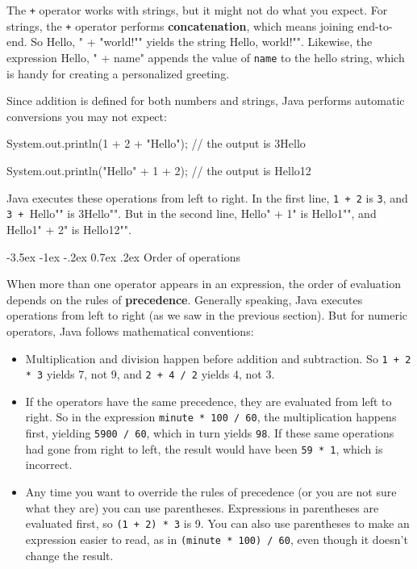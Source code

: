 \documentclass[12pt]{book}
\makeatletter
\theoremstyle{exercise}
\newcommand{\java}[1]{\verb"#1"}
\renewcommand{\section}{\@startsection{section}{1}{\z@}%
    {-3.5ex \@plus -1ex \@minus -.2ex}%
    {0.7ex \@plus.2ex}%
    {\normalfont\Large\bfseries}}
\newcommand{\java}[1]{\lstinline{#1}} %
\makeatother
\begin{document}
The \java{+} operator works with strings, but it might not do what you expect.
For strings, the \java{+} operator performs {\bf concatenation}, which means joining end-to-end.
So \java{"Hello, " + "world!"} yields the string \java{"Hello, world!"}.
Likewise, the expression \java{"Hello, " + name} appends the value of \java{name} to the hello string, which is handy for creating a personalized greeting.

Since addition is defined for both numbers and strings, Java performs automatic conversions you may not expect:

\begin{code}
    System.out.println(1 + 2 + "Hello");
    // the output is 3Hello

    System.out.println("Hello" + 1 + 2);
    // the output is Hello12
\end{code}

Java executes these operations from left to right.
In the first line, \java{1 + 2} is \java{3}, and \java{3 + "Hello"} is \java{"3Hello"}.
But in the second line, \java{"Hello" + 1} is \java{"Hello1"}, and \java{"Hello1" + 2} is \java{"Hello12"}.


\section{Order of operations}


When more than one operator appears in an expression, the order of evaluation depends on the rules of {\bf precedence}.
Generally speaking, Java executes operations from left to right (as we saw in the previous section).
But for numeric operators, Java follows mathematical conventions:

\begin{itemize}

\item Multiplication and division happen before addition and subtraction.
So \java{1 + 2 * 3} yields 7, not 9, and \java{2 + 4 / 2} yields 4, not 3.

\item If the operators have the same precedence, they are evaluated from left to right.
So in the expression \java{minute * 100 / 60}, the multiplication happens first, yielding \java{5900 / 60}, which in turn yields \java{98}.
If these same operations had gone from right to left, the result would have been \java{59 * 1}, which is incorrect.

\item Any time you want to override the rules of precedence (or you are not sure what they are) you can use parentheses.
Expressions in parentheses are evaluated first, so \java{(1 + 2) * 3} is 9.
You can also use parentheses to make an expression easier to read, as in \java{(minute * 100) / 60}, even though it doesn't change the result.

\end{itemize}
\end{document}
